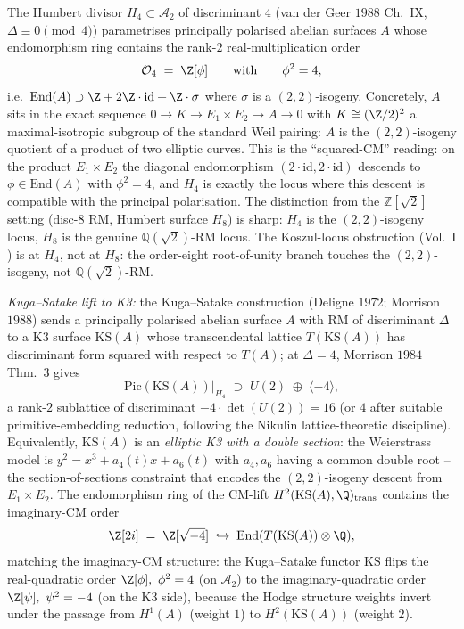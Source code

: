 \begin{remark}
\label{rem:dc-humbert-H4-RM}
\label{rem:dc-humbert-H4-kuga-satake}
The Humbert divisor $H_4 \subset \mathcal A_2$ of discriminant $4$
(van der Geer $1988$ Ch.\ IX, $\Delta \equiv 0 \pmod 4$) parametrises
principally polarised abelian surfaces $A$ whose endomorphism ring
contains the rank-$2$ real-multiplication order
\[
 \mathcal O_{4} \;=\; \Z[\phi]
 \qquad\text{with}\qquad \phi^2 = 4,
\]
i.e.\ $\text{End}(A) \supset \Z + 2\Z\cdot\mathrm{id} + \Z\cdot\sigma$
where $\sigma$ is a $(2,2)$-isogeny. Concretely, $A$ sits in the exact
sequence $0 \to K \to E_1\times E_2 \to A \to 0$ with $K \cong (\Z/2)^2$
a maximal-isotropic subgroup of the standard Weil pairing: $A$ is the
$(2,2)$-isogeny quotient of a product of two elliptic curves.
This is the ``squared-CM'' reading: on the product $E_1 \times E_2$ the
diagonal endomorphism $(2\cdot\mathrm{id}, 2\cdot\mathrm{id})$ descends
to $\phi \in \mathrm{End}(A)$ with $\phi^2 = 4$, and $H_4$ is exactly
the locus where this descent is compatible with the principal
polarisation. The distinction from the $\mathbb Z[\sqrt 2]$ setting
(disc-$8$ RM, Humbert surface $H_8$) is sharp:
$H_4$ is the $(2,2)$-isogeny locus, $H_8$ is the genuine
$\mathbb Q(\sqrt 2)$-RM locus. The Koszul-locus obstruction
(Vol.~I \cite{VolI}) is at $H_4$,
not at $H_8$: the order-eight root-of-unity branch touches the
$(2,2)$-isogeny, not $\mathbb Q(\sqrt 2)$-RM.

\emph{Kuga--Satake lift to K3:} the Kuga--Satake construction
(Deligne $1972$; Morrison $1988$) sends a principally polarised
abelian surface $A$ with RM of discriminant $\Delta$ to a K3 surface
$\mathrm{KS}(A)$ whose transcendental lattice $T(\mathrm{KS}(A))$ has
discriminant form squared with respect to $T(A)$; at
$\Delta = 4$, Morrison $1984$ Thm.\ $3$ gives
\[
 \mathrm{Pic}(\mathrm{KS}(A))\big|_{H_4}
 \;\supset\; U(2) \;\oplus\; \langle -4 \rangle,
\]
a rank-$2$ sublattice of discriminant $-4 \cdot \det(U(2)) = 16$ (or $4$
after suitable primitive-embedding reduction, following the
Nikulin lattice-theoretic discipline). Equivalently, $\mathrm{KS}(A)$
is an \emph{elliptic K3 with a double section}: the Weierstrass model
is $y^2 = x^3 + a_4(t)x + a_6(t)$ with $a_4, a_6$ having a common
double root -- the section-of-sections constraint that encodes the
$(2,2)$-isogeny descent from $E_1\times E_2$. The endomorphism ring of
the CM-lift $H^2(\mathrm{KS}(A), \Q)_{\mathrm{trans}}$ contains the
imaginary-CM order
\[
 \Z[2i] \;=\; \Z[\sqrt{-4}] \;\hookrightarrow\; \mathrm{End}(T(\mathrm{KS}(A))\otimes\Q),
\]
matching the imaginary-CM structure: the Kuga--Satake functor
$\mathrm{KS}$ flips the real-quadratic order $\Z[\phi],\ \phi^2 = 4$
(on $\mathcal A_2$) to the imaginary-quadratic order $\Z[\psi],\
\psi^2 = -4$ (on the K3 side), because the Hodge structure weights
invert under the passage from $H^1(A)$ (weight $1$) to
$H^2(\mathrm{KS}(A))$ (weight $2$).


\end{remark}
